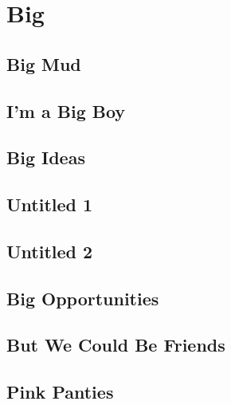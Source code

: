 \documentclass[oneside,14pt]{memoir} %
\newcommand{\chapteronevar}{poem/big_mud.tex}
\newcommand{\chaptertwovar}{poem/im_a_big_boy.tex}
\newcommand{\chapterthreevar}{poem/big_ideas.tex}
\newcommand{\chapterfourvar}{poem/untitled_1.tex}
\newcommand{\chapterfivevar}{poem/untitled_2.tex}
\newcommand{\chaptersixvar}{poem/big_opportunities.tex}
\newcommand{\chaptersevenvar}{poem/but_we_could_be_friends.tex}
\begin{document}
\part{Big}


\chapter{Big Mud}



\chapter{I'm a Big Boy}



\chapter{Big Ideas}



\chapter{Untitled 1}



\chapter{Untitled 2}



\chapter{Big Opportunities}



\chapter{But We Could Be Friends}



\chapter{Pink Panties}
\end{document}
